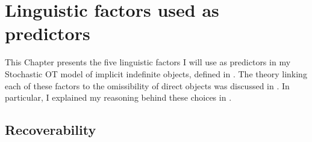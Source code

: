 \setchapterpreamble[u]{\margintoc}
\chapter{Linguistic factors used as predictors}

This Chapter presents the five linguistic factors I will use as predictors in my Stochastic OT model of implicit indefinite objects, defined in . The theory linking each of these factors to the omissibility of direct objects was discussed in . In particular, I explained my reasoning behind these choices in .


\section{Recoverability} 



